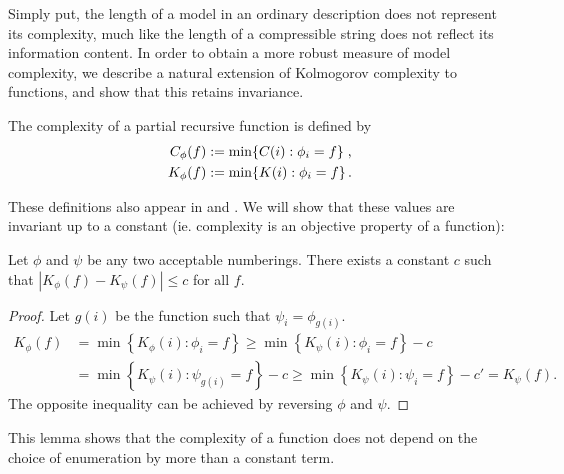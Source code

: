 \documentclass{style/llncs}
\newcommand{\tn}[1]{\textnormal{#1}}
\newcommand{\p}{\,\text{.}}
\begin{document}
Simply put, the length of a model in an ordinary description does not represent its complexity, much like the length of a compressible string does not reflect its information content. In order to obtain a more robust measure of model complexity, we describe a natural extension of Kolmogorov complexity to functions, and show that this retains invariance.

\begin{definition}\belowdisplayskip=-12pt
  The complexity of a partial recursive function is defined by
  \begin{align*}
    C_\phi(f) &:= \min\{C(i):\phi_i=f\}\;\tn{,}\\
    K_\phi(f) &:= \min\{K(i):\phi_i=f\}\p
  \end{align*} \label{definition:model-complexity}
\end{definition}
These definitions also appear in \cite{grunwald2004shannon} and \cite{vitanyi2004meaningful}. We will show that these values are invariant up to a constant (ie. complexity is an objective property of a function):
\begin{lemma}[Invariance]
Let $\phi$ and $\psi$ be any two acceptable numberings. There exists a constant $c$ such that $\left| K_\phi(f) - K_\psi(f)\right | \leq c$ for all $f$. \label{lemma:invariance}
\end{lemma}
\begin{proof}
Let $g(i)$ be the function such that $\psi_i=\phi_{g(i)}$.
\begin{align*}
K_\phi(f) &= \min\left\{ K_\phi(i) : \phi_i= f\right\} 
\geq \min\left\{ K_\psi(i) : \phi_i= f\right\} - c\\
&= \min\left\{ K_\psi(i) : \psi_{g(i)}= f\right\} - c
\geq \min\left\{ K_\psi(i) : \psi_i= f\right\} - c' = K_\psi(f).
\end{align*}
The opposite inequality can be achieved by reversing $\phi$ and $\psi$. 
\end{proof}
This lemma shows that the complexity of a function does not depend on the choice of
enumeration by more than a constant term.
\end{document}
